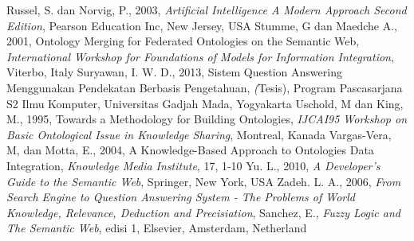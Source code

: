 \begin{thebibliography}{99}
		Russel, S. dan Norvig, P., 2003, \emph{Artificial Intelligence A Modern Approach Second Edition}, Pearson Education Inc, New Jersey, USA
		Stumme, G dan Maedche A., 2001, Ontology Merging for Federated Ontologies on the Semantic Web, \emph{ International Workshop for Foundations of Models for Information Integration}, Viterbo, Italy
		Suryawan, I. W. D., 2013, Sistem Question Answering Menggunakan Pendekatan Berbasis Pengetahuan, \emph(Tesis), Program Pascasarjana S2 Ilmu Komputer, Universitas Gadjah Mada, Yogyakarta
		Uschold, M dan King, M., 1995, Towards a Methodology for Building Ontologies, \emph{IJCAI95 Workshop on Basic Ontological Issue in Knowledge Sharing}, Montreal, Kanada
		Vargas-Vera, M, dan Motta, E., 2004, A Knowledge-Based Approach to Ontologies Data Integration, \emph{Knowledge Media Institute}, 17, 1-10
		Yu. L., 2010, \emph{A Developer's Guide to the Semantic Web}, Springer, New York, USA
		Zadeh. L. A., 2006, \emph{From Search Engine to Question Answering System - The Problems of World Knowledge, Relevance, Deduction and Precisiation}, Sanchez, E., \emph{Fuzzy Logic and The Semantic Web}, edisi 1, Elsevier, Amsterdam, Netherland
\end{thebibliography}